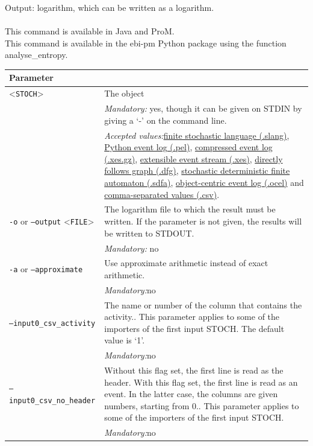 {\noindent Output: logarithm, which can be written as a logarithm.\\
\\This command is available in Java and ProM.
\\This command is available in the ebi-pm Python package using the function analyse\_entropy.
\begin{tabularx}{\linewidth}{lX}
\toprule
Parameter \\\midrule
<\texttt{STOCH}>&The object\\
&\textit{Mandatory:} \quad yes, though it can be given on STDIN by giving a `-' on the command line.\\
&\textit{Accepted values:}\quad \hyperref[filehandler:finite stochastic language]{finite stochastic language (.slang)}, \hyperref[filehandler:Python event log]{Python event log (.pel)}, \hyperref[filehandler:compressed event log]{compressed event log (.xes.gz)}, \hyperref[filehandler:extensible event stream]{extensible event stream (.xes)}, \hyperref[filehandler:directly follows graph]{directly follows graph (.dfg)}, \hyperref[filehandler:stochastic deterministic finite automaton]{stochastic deterministic finite automaton (.sdfa)}, \hyperref[filehandler:object-centric event log]{object-centric event log (.ocel)} and \hyperref[filehandler:comma-separated values]{comma-separated values (.csv)}.\\
\texttt{-o} or \texttt{--output} <\texttt{FILE}> &
The logarithm file to which the result must be written. If the parameter is not given, the results will be written to STDOUT.\\
&\textit{Mandatory:} \quad no\\
\texttt{-a} or \texttt{--approximate} & Use approximate arithmetic instead of exact arithmetic.\\
&\textit{Mandatory:}\quad no\\
\texttt{--input0\_csv\_activity} & The name or number of the column that contains the activity.. This parameter applies to some of the importers of the first input STOCH. The default value is `1'.\\
&\textit{Mandatory:}\quad no\\
\texttt{--input0\_csv\_no\_header} & Without this flag set, the first line is read as the header. 
    With this flag set, the first line is read as an event. In the latter case, the columns are given numbers, starting from 0.. This parameter applies to some of the importers of the first input STOCH. \\
&\textit{Mandatory:}\quad no\\

\end{tabularx}}
